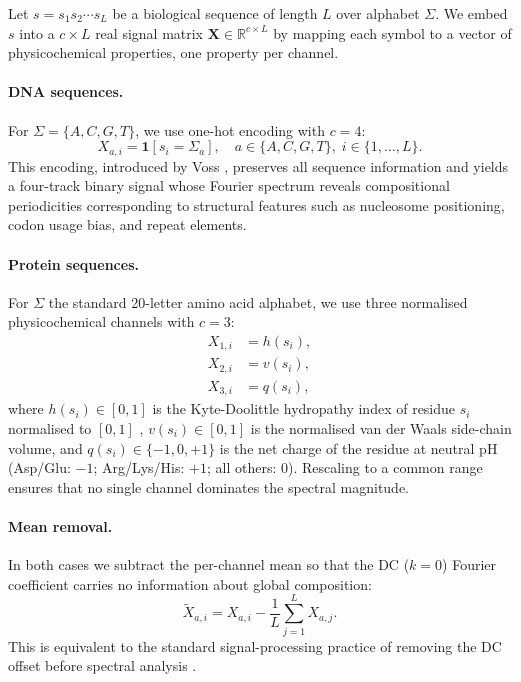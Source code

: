 \documentclass[twocolumn,11pt,a4paper]{article}
\theoremstyle{definition}
\theoremstyle{remark}
\newcommand{\RR}{\mathbb{R}}
\begin{document}
Let $s = s_1 s_2 \cdots s_L$ be a biological sequence of length $L$ over
alphabet $\Sigma$. We embed $s$ into a $c \times L$ real signal matrix
$\mathbf{X} \in \RR^{c \times L}$ by mapping each symbol to a vector of
physicochemical properties, one property per channel.

\paragraph{DNA sequences.}
For $\Sigma = \{A, C, G, T\}$, we use one-hot encoding with $c = 4$:
\begin{equation}
  X_{a,i} = \mathbf{1}[s_i = \Sigma_a], \quad a \in \{A,C,G,T\},\;
  i \in \{1,\ldots,L\}.
  \label{eq:onehot}
\end{equation}
This encoding, introduced by Voss \citep{voss1992}, preserves all sequence
information and yields a four-track binary signal whose Fourier spectrum
reveals compositional periodicities corresponding to structural features such
as nucleosome positioning, codon usage bias, and repeat elements.

\paragraph{Protein sequences.}
For $\Sigma$ the standard 20-letter amino acid alphabet, we use three
normalised physicochemical channels with $c = 3$:
\begin{align}
  X_{1,i} &= h(s_i), \label{eq:hydropathy}\\
  X_{2,i} &= v(s_i), \label{eq:volume}\\
  X_{3,i} &= q(s_i), \label{eq:charge}
\end{align}
where $h(s_i) \in [0,1]$ is the Kyte-Doolittle hydropathy index of residue
$s_i$ normalised to $[0,1]$ \citep{kyte1982}, $v(s_i) \in [0,1]$ is the
normalised van der Waals side-chain volume, and $q(s_i) \in \{-1,0,+1\}$ is
the net charge of the residue at neutral pH (Asp/Glu: $-1$; Arg/Lys/His: $+1$;
all others: $0$). Rescaling to a common range ensures that no single channel
dominates the spectral magnitude.

\paragraph{Mean removal.}
In both cases we subtract the per-channel mean so that the DC ($k=0$) Fourier
coefficient carries no information about global composition:
\begin{equation}
  \widetilde{X}_{a,i} = X_{a,i} - \frac{1}{L}\sum_{j=1}^{L} X_{a,j}.
  \label{eq:mean_removal}
\end{equation}
This is equivalent to the standard signal-processing practice of removing the
DC offset before spectral analysis \citep{oppenheim2009}.
\end{document}
